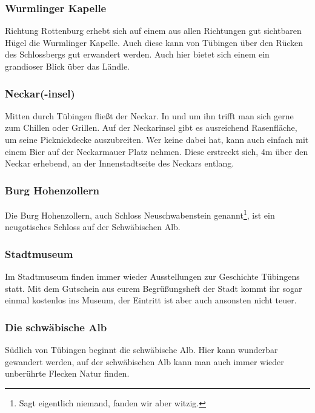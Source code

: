 \subsubsection*{Wurmlinger Kapelle}
Richtung Rottenburg erhebt sich auf einem aus allen Richtungen gut sichtbaren Hügel die Wurmlinger Kapelle. Auch diese kann von Tübingen über den Rücken des Schlossbergs gut erwandert werden. Auch hier bietet sich einem ein grandioser Blick über das Ländle.

\subsubsection*{Neckar(-insel)}
Mitten durch Tübingen fließt der Neckar. In und um ihn trifft man sich gerne zum Chillen oder Grillen. Auf der Neckarinsel gibt es ausreichend Rasenfläche, um seine Picknickdecke auszubreiten. Wer keine dabei hat, kann auch einfach mit einem Bier auf der Neckarmauer Platz nehmen. Diese erstreckt sich, 4m über den Neckar erhebend, an der Innenstadtseite des Neckars entlang.

\subsubsection*{Burg Hohenzollern}
Die Burg Hohenzollern, auch Schloss Neuschwabenstein genannt\footnote{Sagt eigentlich niemand, fanden wir aber witzig.}, ist ein neugotisches Schloss auf der Schwäbischen Alb.

\subsubsection*{Stadtmuseum}
Im Stadtmuseum finden immer wieder Ausstellungen zur Geschichte Tübingens statt. Mit dem Gutschein aus eurem Begrüßungsheft der Stadt kommt ihr sogar einmal kostenlos ins Museum, der Eintritt ist aber auch ansonsten nicht teuer.

\subsubsection*{Die schwäbische Alb}
Südlich von Tübingen beginnt die schwäbische Alb. Hier kann wunderbar gewandert werden, auf der schwäbischen Alb kann man auch immer wieder unberührte Flecken Natur finden.
\vfill
